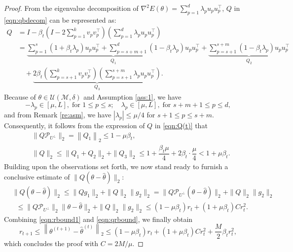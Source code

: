 \documentclass[final]{siamart251216}
\begin{document}
\begin{proof}
From the eigenvalue decomposition of $\nabla^2 E(\theta)= \sum_{p=1}^{d} \lambda_pu_pu_p^{\top}$, 
$Q$ in \eqref{eqn:qbdecom} can be represented as: 
\begin{equation}
\begin{aligned}
Q &= 
I-\beta_t \left(I-2\sum_{p=1}^k v_pv_p^{\top}\right)\left(\sum_{p=1}^{d} \lambda_pu_pu_p^{\top}\right)\\
&=
\underbrace{\sum_{p=1}^s(1+\beta_t\lambda_p)u_pu_p^{\top}
+ \sum_{p=s+m+1}^{d}(1-\beta_t\lambda_p)u_pu_p^{\top}
}_{Q_1}
+
\underbrace{
\sum_{p=s+1}^{s+m}(1-\beta_t\lambda_p)u_pu_p^{\top}
}_{Q_2}
\\&
\quad+
\underbrace{2\beta_t
\left(\sum_{p=s+1}^k v_pv_p^{\top}\right)
\left(\sum_{p=s+1}^{s+m} \lambda_pu_pu_p^{\top}\right)}_{Q_3}.
\label{eqn:Q(t)}
\end{aligned}
\end{equation}
Because of $\theta \in \mathcal{U}(\mathcal{M},\delta)$ and Assumption \ref{ass:1}, we have
\begin{equation*}
-{\lambda_p}\in[\mu,L],\; \text{for }
1\leqslant p\leqslant s;\quad
{\lambda_p}\in[\mu,L],\; \text{for }
s+m+1\leqslant p\leqslant d,
\end{equation*}
and from Remark \ref{re:asm}, we have $|{\lambda_p}|\leqslant \mu/4$ for $s+1\leqslant p\leqslant s+m$.
Consequently, it follows from the expression of $Q$ in \eqref{eqn:Q(t)} that 
\begin{equation}
\begin{aligned}
&\|Q\mathcal{P}_{U^\perp}\|_{2}
=\left\|Q_1\right\|_2
\leqslant 1-\mu\beta_t,\\
&\|Q\|_{2}\leqslant
\|Q_1 + Q_2\|_2 + \|Q_3\|_2 
\leqslant
1+\dfrac{\beta_t\mu}{4} + 2\beta_t \cdot \dfrac{\mu}{4}
<
1+\mu\beta_t.
\end{aligned}
\end{equation}
Building upon the observations set forth, we now stand ready to furnish a conclusive estimate of $\|Q(\theta-\hat{\theta})\|_{2}$:
\begin{equation}\label{eqn:qrbound}
\begin{aligned}
&\|Q(\theta-\hat{\theta})\|_{2}\leqslant
\|Qg_1\|_{2}+ \|Q\|_{2}\|g_2\|_{2} = \|Q\mathcal{P}_{U^\perp}(\theta-\hat{\theta})\|_{2}+\|Q\|_{2}\|g_2\|_{2} \\
&\;\;\leqslant \|Q\mathcal{P}_{U^\perp}\|_{2}\|\theta-\hat{\theta}\|_{2}+\|Q\|_{2}\|g_2\|_{2}
\leqslant\left(1-\mu\beta_t\right)r_t+
\left(1+\mu\beta_t\right)Cr_t^2.
\end{aligned}
\end{equation}
Combining \eqref{eqn:rbound1} and \eqref{eqn:qrbound}, we finally obtain
\begin{equation}\label{eqn:rt+1}
r_{t+1} \leqslant
\left\|\theta^{(t+1)}-\hat{\theta}^{(t)}\right\|_2
\leqslant
\left(1-\mu\beta_t\right)r_t+
\left(1+\mu\beta_t\right)Cr_t^2 + 
\frac{M}{2}\beta_tr_t^2,
\end{equation}
which concludes the proof with $C = 2M/\mu$.
\end{proof}
\end{document}

